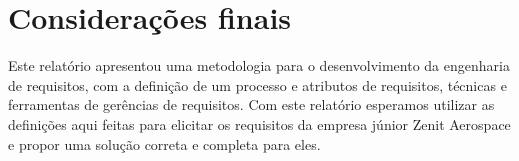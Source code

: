 \chapter[Considera{\c c}{\~o}es finais]{Considerações finais}

Este relatório apresentou uma metodologia para o desenvolvimento da engenharia de requisitos, com a definição de um processo e atributos de requisitos, técnicas e ferramentas de gerências de requisitos. Com este relatório esperamos utilizar as definições aqui feitas para elicitar os requisitos da empresa júnior Zenit Aerospace e propor uma solução correta e completa para eles.


